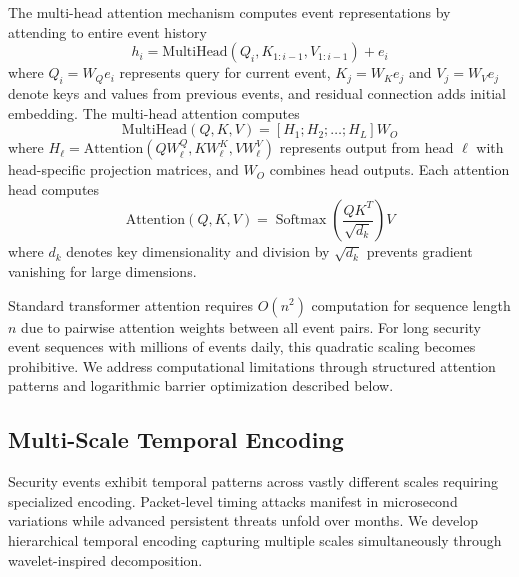\documentclass[10pt,journal,compsoc]{IEEEtran}
\newcommand{\Softmax}{\operatorname{Softmax}}
\begin{document}
The multi-head attention mechanism computes event representations by attending to entire event history
\begin{equation}
h_i = \text{MultiHead}(Q_i, K_{1:i-1}, V_{1:i-1}) + e_i
\end{equation}
where $Q_i = W_Q e_i$ represents query for current event, $K_j = W_K e_j$ and $V_j = W_V e_j$ denote keys and values from previous events, and residual connection adds initial embedding. The multi-head attention computes
\begin{equation}
\text{MultiHead}(Q, K, V) = [H_1; H_2; \ldots; H_L] W_O
\end{equation}
where $H_\ell = \text{Attention}(Q W_\ell^Q, K W_\ell^K, V W_\ell^V)$ represents output from head $\ell$ with head-specific projection matrices, and $W_O$ combines head outputs. Each attention head computes
\begin{equation}
\text{Attention}(Q, K, V) = \Softmax\left(\frac{QK^T}{\sqrt{d_k}}\right) V
\end{equation}
where $d_k$ denotes key dimensionality and division by $\sqrt{d_k}$ prevents gradient vanishing for large dimensions.

Standard transformer attention requires $O(n^2)$ computation for sequence length $n$ due to pairwise attention weights between all event pairs. For long security event sequences with millions of events daily, this quadratic scaling becomes prohibitive. We address computational limitations through structured attention patterns and logarithmic barrier optimization described below.

\subsection{Multi-Scale Temporal Encoding}

Security events exhibit temporal patterns across vastly different scales requiring specialized encoding. Packet-level timing attacks manifest in microsecond variations while advanced persistent threats unfold over months. We develop hierarchical temporal encoding capturing multiple scales simultaneously through wavelet-inspired decomposition.
\end{document}
